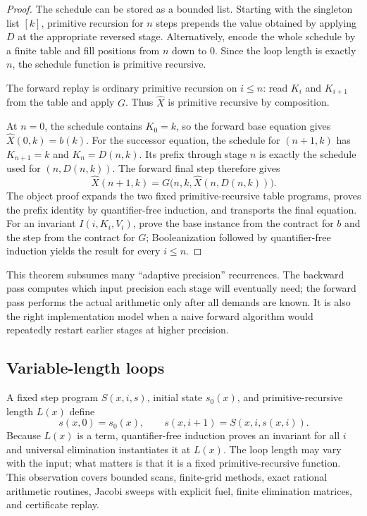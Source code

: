 \begin{proof}
The schedule can be stored as a bounded list.  Starting with the singleton list $[k]$, primitive recursion for $n$ steps prepends the value obtained by applying $D$ at the appropriate reversed stage.  Alternatively, encode the whole schedule by a finite table and fill positions from $n$ down to $0$.  Since the loop length is exactly $n$, the schedule function is primitive recursive.

The forward replay is ordinary primitive recursion on $i\leq n$: read $K_i$ and $K_{i+1}$ from the table and apply $G$.  Thus $\widehat X$ is primitive recursive by composition.

At $n=0$, the schedule contains $K_0=k$, so the forward base equation gives $\widehat X(0,k)=b(k)$.  For the successor equation, the schedule for $(n+1,k)$ has $K_{n+1}=k$ and $K_n=D(n,k)$.  Its prefix through stage $n$ is exactly the schedule used for $(n,D(n,k))$.  The forward final step therefore gives
\[
 \widehat X(n+1,k)
 =G\bigl(n,k,\widehat X(n,D(n,k))\bigr).
\]
The object proof expands the two fixed primitive-recursive table programs, proves the prefix identity by quantifier-free induction, and transports the final equation.  For an invariant $I(i,K_i,V_i)$, prove the base instance from the contract for $b$ and the step from the contract for $G$; Booleanization followed by quantifier-free induction yields the result for every $i\leq n$.
\end{proof}

This theorem subsumes many ``adaptive precision'' recurrences.  The backward pass computes which input precision each stage will eventually need; the forward pass performs the actual arithmetic only after all demands are known.  It is also the right implementation model when a naive forward algorithm would repeatedly restart earlier stages at higher precision.

\subsection{Variable-length loops}

A fixed step program $S(x,i,s)$, initial state $s_0(x)$, and primitive-recursive length $L(x)$ define
\[
 s(x,0)=s_0(x),\qquad s(x,i+1)=S(x,i,s(x,i)).
\]
Because $L(x)$ is a term, quantifier-free induction proves an invariant for all $i$ and universal elimination instantiates it at $L(x)$.  The loop length may vary with the input; what matters is that it is a fixed primitive-recursive function.  This observation covers bounded scans, finite-grid methods, exact rational arithmetic routines, Jacobi sweeps with explicit fuel, finite elimination matrices, and certificate replay.

